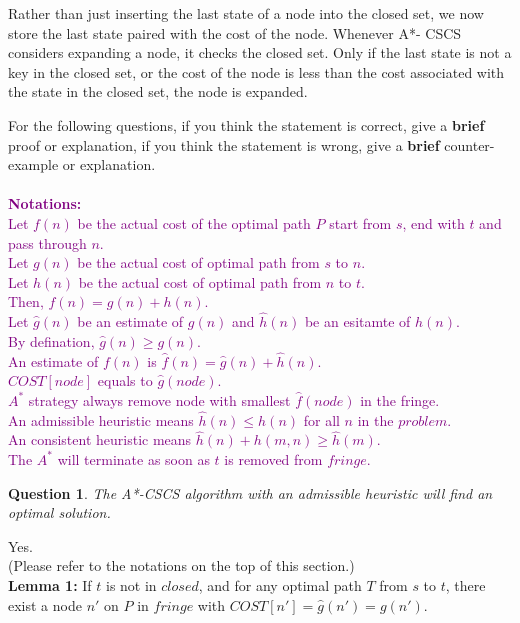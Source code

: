 \documentclass[10.5pt]{article}
\newtheorem{Q}{Question}
\begin{document}
Rather than just inserting the last state of a node into the closed set, we now store the last state paired with the cost of the node. Whenever A*- CSCS considers expanding a node, it checks the closed set. Only if the last state is not a key in the closed set, or the cost of the node is less than the cost associated with the state in the closed set, the node is expanded.

For the following questions, if you think the statement is correct, give a \textbf{brief} proof or explanation, if you think the statement is wrong, give a \textbf{brief} counter-example or explanation.\\
\\
\textcolor{purple}{
	\textbf{Notations: }\\
	Let $f(n)$ be the actual cost of the optimal path $P$ start from $s$, end with $t$ and pass through $n$. \\
	Let $g(n)$ be the actual cost of optimal path from $s$ to $n$.\\
	Let $h(n)$ be the actual cost of optimal path from $n$ to $t$.\\
	Then, $f(n) = g(n) + h(n)$.\\
	Let $\hat g(n)$ be an estimate of $g(n)$ and $\hat h(n)$ be an esitamte of $h(n)$.\\
	By defination, $\hat g(n) \ge g(n)$.\\
	An estimate of $f(n)$ is $\hat f(n) = \hat g(n) + \hat h(n)$.\\
	$COST[node]$ equals to $\hat g(node)$.\\
	$A^*$ strategy always remove node with smallest $\hat f(node)$ in the fringe.\\
	An admissible heuristic means $\hat h(n) \le h(n)$ for all $n$ in the $problem$.\\
	An consistent heuristic means \(\hat h(n) + h(m, n) \ge \hat h(m)\).\\
	The $A^*$ will terminate as soon as $t$ is removed from $fringe$.
}\\
\pagebreak
\begin{Q}
	The A*-CSCS algorithm with an admissible heuristic will find an optimal solution.
\end{Q}
Yes.\\
(Please refer to the notations on the top of this section.)\\
\textbf{Lemma 1:} If $t$ is not in $closed$, and for any optimal path $T$ from $s$ to $t$, there exist a node $n'$ on $P$ in $fringe$ with $COST[n'] = \hat g(n') = g(n')$.\\
\end{document}
